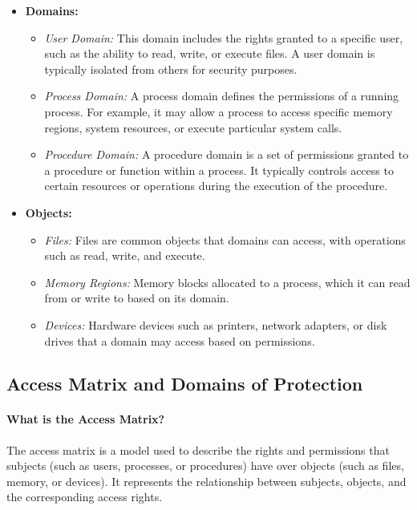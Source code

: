 \begin{itemize}
    \item \textbf{Domains:}
    \begin{itemize}
        \item \textit{User Domain:} This domain includes the rights granted to a specific user, such as the ability to read, write, or execute files. A user domain is typically isolated from others for security purposes.
        \item \textit{Process Domain:} A process domain defines the permissions of a running process. For example, it may allow a process to access specific memory regions, system resources, or execute particular system calls.
        \item \textit{Procedure Domain:} A procedure domain is a set of permissions granted to a procedure or function within a process. It typically controls access to certain resources or operations during the execution of the procedure.
    \end{itemize}
    
    \item \textbf{Objects:}
    \begin{itemize}
        \item \textit{Files:} Files are common objects that domains can access, with operations such as read, write, and execute.
        \item \textit{Memory Regions:} Memory blocks allocated to a process, which it can read from or write to based on its domain.
        \item \textit{Devices:} Hardware devices such as printers, network adapters, or disk drives that a domain may access based on permissions.
    \end{itemize}
\end{itemize}


\subsection{Access Matrix and Domains of Protection}

\paragraph{What is the Access Matrix?}
The access matrix is a model used to describe the rights and permissions that subjects (such as users, processes, or procedures) have over objects (such as files, memory, or devices). It represents the relationship between subjects, objects, and the corresponding access rights.

